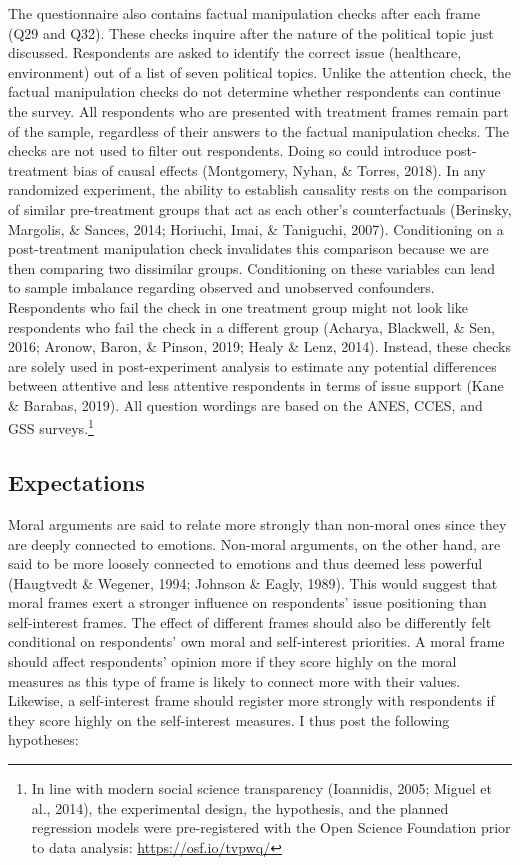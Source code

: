 \documentclass[12pt,econ]{sources/authesis}
\begin{document}
The questionnaire also contains factual manipulation checks after each frame (Q29 and Q32). These checks inquire after the nature of the political topic just discussed. Respondents are asked to identify the correct issue (healthcare, environment) out of a list of seven political topics. Unlike the attention check, the factual manipulation checks do not determine whether respondents can continue the survey. All respondents who are presented with treatment frames remain part of the sample, regardless of their answers to the factual manipulation checks. The checks are not used to filter out respondents. Doing so could introduce post-treatment bias of causal effects (Montgomery, Nyhan, \& Torres, 2018). In any randomized experiment, the ability to establish causality rests on the comparison of similar pre-treatment groups that act as each other's counterfactuals (Berinsky, Margolis, \& Sances, 2014; Horiuchi, Imai, \& Taniguchi, 2007). Conditioning on a post-treatment manipulation check invalidates this comparison because we are then comparing two dissimilar groups. Conditioning on these variables can lead to sample imbalance regarding observed and unobserved confounders. Respondents who fail the check in one treatment group might not look like respondents who fail the check in a different group (Acharya, Blackwell, \& Sen, 2016; Aronow, Baron, \& Pinson, 2019; Healy \& Lenz, 2014). Instead, these checks are solely used in post-experiment analysis to estimate any potential differences between attentive and less attentive respondents in terms of issue support (Kane \& Barabas, 2019). All question wordings are based on the ANES, CCES, and GSS surveys.\footnote{In line with modern social science transparency (Ioannidis, 2005; Miguel et al., 2014), the experimental design, the hypothesis, and the planned regression models were pre-registered with the Open Science Foundation prior to data analysis: \url{https://osf.io/tvpwq/}}

\hypertarget{framing-design-expectations}{%
\subsection{Expectations}\label{framing-design-expectations}}

Moral arguments are said to relate more strongly than non-moral ones since they are deeply connected to emotions. Non-moral arguments, on the other hand, are said to be more loosely connected to emotions and thus deemed less powerful (Haugtvedt \& Wegener, 1994; Johnson \& Eagly, 1989). This would suggest that moral frames exert a stronger influence on respondents' issue positioning than self-interest frames. The effect of different frames should also be differently felt conditional on respondents' own moral and self-interest priorities. A moral frame should affect respondents' opinion more if they score highly on the moral measures as this type of frame is likely to connect more with their values. Likewise, a self-interest frame should register more strongly with respondents if they score highly on the self-interest measures. I thus post the following hypotheses:
\end{document}
